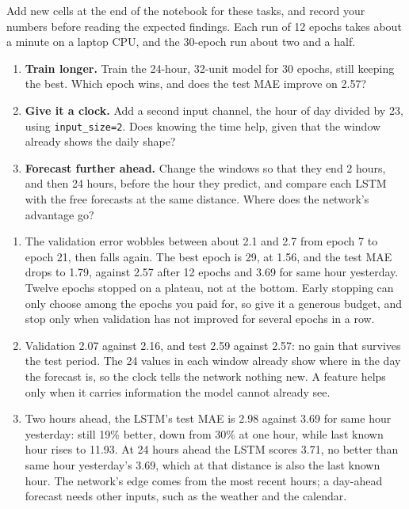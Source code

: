 \begin{yourturn}
Add new cells at the end of the notebook for these tasks, and record your numbers before reading the expected findings. Each run of 12 epochs takes about a minute on a laptop CPU, and the 30-epoch run about two and a half.
\begin{enumerate}
  \item \textbf{Train longer.} Train the 24-hour, 32-unit model for 30 epochs, still keeping the best. Which epoch wins, and does the test MAE improve on 2.57?
  \item \textbf{Give it a clock.} Add a second input channel, the hour of day divided by 23, using \texttt{input\_size=2}. Does knowing the time help, given that the window already shows the daily shape?
  \item \textbf{Forecast further ahead.} Change the windows so that they end 2 hours, and then 24 hours, before the hour they predict, and compare each LSTM with the free forecasts at the same distance. Where does the network's advantage go?
\end{enumerate}
\end{yourturn}

\begin{expectedfindings}
\begin{enumerate}
  \item The validation error wobbles between about 2.1 and 2.7 from epoch 7 to epoch 21, then falls again. The best epoch is 29, at 1.56, and the test MAE drops to 1.79, against 2.57 after 12 epochs and 3.69 for same hour yesterday. Twelve epochs stopped on a plateau, not at the bottom. Early stopping can only choose among the epochs you paid for, so give it a generous budget, and stop only when validation has not improved for several epochs in a row.
  \item Validation 2.07 against 2.16, and test 2.59 against 2.57: no gain that survives the test period. The 24 values in each window already show where in the day the forecast is, so the clock tells the network nothing new. A feature helps only when it carries information the model cannot already see.
  \item Two hours ahead, the LSTM's test MAE is 2.98 against 3.69 for same hour yesterday: still 19\% better, down from 30\% at one hour, while last known hour rises to 11.93. At 24 hours ahead the LSTM scores 3.71, no better than same hour yesterday's 3.69, which at that distance is also the last known hour. The network's edge comes from the most recent hours; a day-ahead forecast needs other inputs, such as the weather and the calendar.
\end{enumerate}
\end{expectedfindings}

